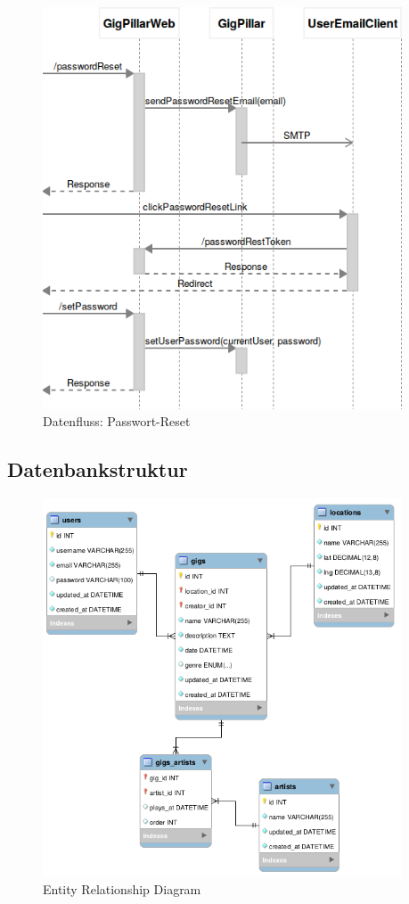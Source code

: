 \begin{figure}[!htb]
  \centering
  \includegraphics[width=0.95\textwidth]{konzept/datenfluss-passwort-reset.png}
  \caption{Datenfluss: Passwort-Reset}
\end{figure}

\clearpage
\subsection{Datenbankstruktur}\label{datenbankstruktur}

\begin{figure}[!htb]
  \centering
  \includegraphics[width=0.95\textwidth]{konzept/erd.png}
  \caption{Entity Relationship Diagram}
\end{figure}

